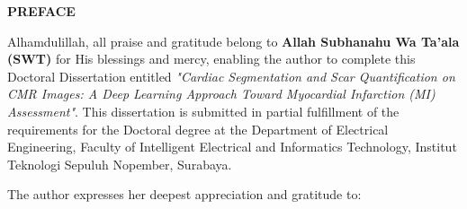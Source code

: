 \begin{center}
	\large\textbf{PREFACE}
\end{center}
\vspace{1ex}

Alhamdulillah, all praise and gratitude belong to \textbf{Allah Subhanahu Wa Ta'ala (SWT)} for His blessings and mercy, enabling the author to complete this Doctoral Dissertation entitled \textit{"Cardiac Segmentation and Scar Quantification on CMR Images: A Deep Learning Approach Toward Myocardial Infarction (MI) Assessment"}. This dissertation is submitted in partial fulfillment of the requirements for the Doctoral degree at the Department of Electrical Engineering, Faculty of Intelligent Electrical and Informatics Technology, Institut Teknologi Sepuluh Nopember, Surabaya.

The author expresses her deepest appreciation and gratitude to:

